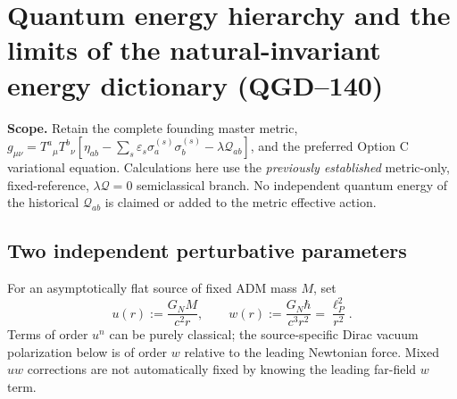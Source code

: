 \documentclass[11pt,a4paper]{article}
\begin{document}
\section{Quantum energy hierarchy and the limits of the natural-invariant energy dictionary (QGD--140)}
\label{sec:qgd140-quantumenergy}
\textbf{Scope.} Retain the complete founding master metric,
$g_{\mu\nu}=T^a{}_\mu T^b{}_\nu[\eta_{ab}-\sum_s\varepsilon_s\sigma_a^{(s)}\sigma_b^{(s)}-\lambda\mathcal Q_{ab}]$,
and the preferred Option C variational equation. Calculations here use the
\emph{previously established} metric-only, fixed-reference, $\lambda\mathcal Q=0$
semiclassical branch. No independent quantum energy of the historical
$\mathcal Q_{ab}$ is claimed or added to the metric effective action.

\subsection{Two independent perturbative parameters}
For an asymptotically flat source of fixed ADM mass $M$, set
\begin{equation}\label{eq:qgd140-scales}
 u(r):=\frac{G_NM}{c^2r},\qquad
 w(r):=\frac{G_N\hbar}{c^3r^2}=\frac{\ell_P^2}{r^2}.
\end{equation}
Terms of order $u^n$ can be purely classical; the source-specific Dirac
vacuum polarization below is of order $w$ relative to the leading
Newtonian force. Mixed $u w$ corrections are not automatically fixed by
knowing the leading far-field $w$ term.
\end{document}
